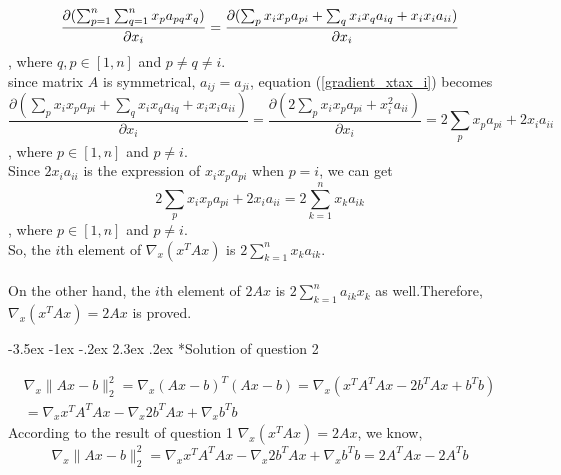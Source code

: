 \documentclass[12pt]{article}
\makeatletter
\renewcommand\section{\@startsection {section}{1}{\z@}%
	{-3.5ex \@plus -1ex \@minus -.2ex}%
	{2.3ex \@plus.2ex}%
	{\normalfont\large\bfseries}}%
\makeatother
\begin{document}
	\begin{equation}\label{gradient_xtax_i}
	\frac{\partial(\sum_{p=1}^n \sum_{q=1}^n x_pa_{pq}x_q)}{\partial x_i} \\
	=\frac{\partial(\sum_{p} x_ix_pa_{pi}+\sum_{q} x_ix_qa_{iq}+x_ix_ia_{ii})}{\partial x_i}
	\end{equation}
	, where $q, p \in [1, n]$ and $p\neq q\neq i$.
	\\
	since matrix $A$ is symmetrical, $a_{ij}=a_{ji}$, equation (\ref{gradient_xtax_i}) becomes
	\begin{equation}\label{gradient_xtax_i_mod}
	\frac{\partial(\sum_{p} x_ix_pa_{pi}+\sum_{q} x_ix_qa_{iq}+x_ix_ia_{ii})}{\partial x_i}
	=\frac{\partial(2\sum_{p} x_ix_pa_{pi}+x_i^2a_{ii})}{\partial x_i}
	=2\sum_{p} x_pa_{pi}+2x_ia_{ii}
	\end{equation}
	, where $p \in [1, n]$ and $p\neq i$.\\
	Since $2x_ia_{ii}$ is the expression of $x_ix_pa_{pi}$ when $p=i$, we can get
	\begin{equation}\label{gradient_xtax_i_final}
	2\sum_{p} x_ix_pa_{pi}+2x_ia_{ii}
	=2\sum_{k=1}^n x_ka_{ik}
	\end{equation}
	, where $p \in [1, n]$ and $p\neq i$.\\
	So, the $i$th element of $\nabla_x(x^TAx)$ is $2\sum_{k=1}^n x_ka_{ik}$.\\
	\\
	\noindent
	On the other hand, the $i$th element of $2Ax$ is $2\sum_{k=1}^n a_{ik}x_k$ as well.Therefore, $\nabla_x(x^TAx)=2Ax$ is proved.
	
	\section*{Solution of question 2}
	
	\begin{equation}\label{Ax-b_grad_1}
	\begin{split}
	\nabla_x\lVert Ax-b\rVert_2^2
	=\nabla_x (Ax-b)^T(Ax-b)
	=\nabla_x (x^TA^TAx-2b^TAx+b^Tb) \\
	=\nabla_x x^TA^TAx-\nabla_x2b^TAx+\nabla_x b^Tb
	\end{split}
	\end{equation}
	According to the result of question 1 $\nabla_x(x^TAx)=2Ax$, we know,
	\begin{equation}\label{Ax-b_grad_2}
	\nabla_x\lVert Ax-b\rVert_2^2
	=\nabla_x x^TA^TAx-\nabla_x2b^TAx+\nabla_x b^Tb
	=2A^TAx-2A^Tb
	\end{equation}
	
\end{document}
